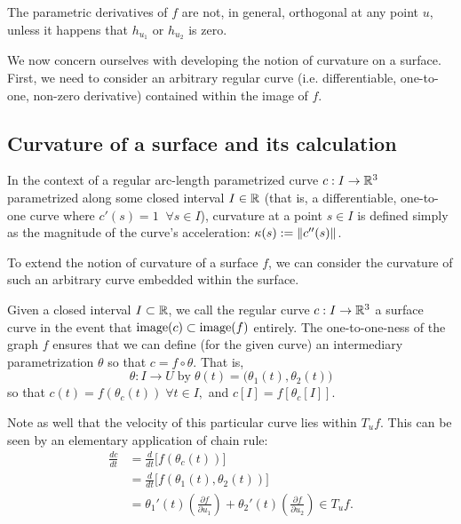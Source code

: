 	The parametric derivatives of $f$ are not, in general, orthogonal at any point $u$, unless it happens that $h_{u_1} $ or $h_{u_2}$ is zero.
	

We now concern ourselves with developing the notion of curvature on a surface. First, we need to consider an arbitrary regular curve (i.e. differentiable, one-to-one, non-zero derivative) contained within the image of $f$. 
  	
 

\subsection{Curvature of a surface and its calculation}
In the context of a regular arc-length parametrized curve $c: I \to \mathbb{R}^3$ parametrized along some closed interval $I\in \mathbb{R}$
 (that is, a differentiable, one-to-one curve where $c'(s) = 1 \;\; \forall s \in I$), curvature at a point $s \in I$ is defined simply as the magnitude of the curve's acceleration: $\kappa(s) := \Vert c''(s)\Vert$.
 
 To extend the notion of curvature of a surface $f$, we can consider the curvature of such an arbitrary curve embedded within the surface.
 
 \begin{defn} \label{def:curve-on-a-surface}
 	Given a closed interval $I \subset \mathbb{R}$, we call the regular curve
 	$c: I \to \mathbb{R}^3$ a surface curve in the event that $\mathrm{image}(c) \subset \mathrm{image}(f)$ entirely. The one-to-one-ness of the graph $f$ ensures that we can define (for the given curve) an intermediary parametrization $\theta$  so that
 	$ c = f \circ \theta $. That is,
 	\[
 	\theta : I \to U \; \textrm{by} \; \theta(t) = \big(\theta_1(t), \theta_2(t)\big)
 	\]
 	so that $c(t) = f(\theta_c(t)) \;\forall t\in I,$
 	and $c[I] = f\left[\theta_c[I]\right]$.
 \end{defn}
 Note as well that the velocity of this particular curve lies within $T_u f$. This
 can be seen by an elementary application of chain rule:
 \begin{align}
 \frac{d c}{dt} &= \frac{d}{dt}\big[ f(\theta_c(t))\big] \nonumber \\
 &= \frac{d}{dt}\big[f(\theta_1(t), \theta_2(t))\big] \nonumber \\
 &= \theta_1'(t)\left( \frac{\partial f}{\partial u_1} \right) + 
 \theta_2'(t)\left( \frac{\partial f}{\partial u_2} \right) \in T_uf.
 \end{align}
 
